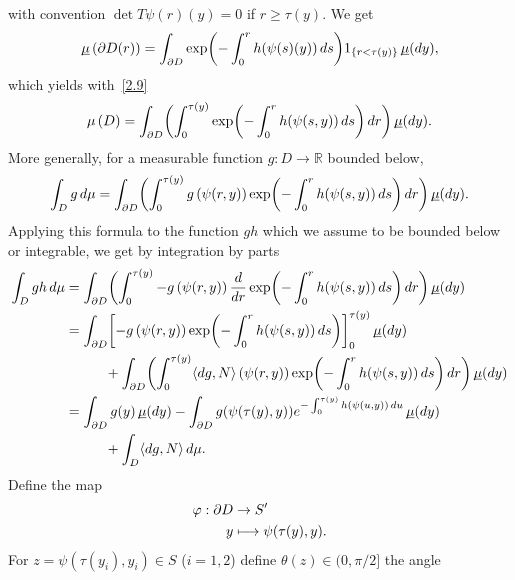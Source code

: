 \documentclass[JEP,XML,SOM,Unicode,NoFloatCountersInSection,published]{cedram}
\newcommand\mto{\mathchoice{\longmapsto}{\mapsto}{\mapsto}{\mapsto}}
\theoremstyle{plain}
\theoremstyle{definition}
\newcommand{\RR}{{\mathbb R}}
\newcommand{\usm}{{\underline{\smash{\mu}}}}
\let\f\frac
\begin{document}
with convention $\det T\psi(r)(y)=0$ if $r\ge \tau(y)$. We get
\begin{equation}
\usm\left(\partial D(r)\right)=\int_{\partial D}\exp\biggl(-\int_0^rh(\psi(s)(y))\,ds \biggr)1_{\{r<\tau(y)\}}\,\usm(dy),
\end{equation}
which yields with~\eqref{2.9}
\begin{equation}
\mu\left(D\right)=\int_{\partial D}\biggl(\int_0^{\tau(y)}\exp\biggl(-\int_0^rh(\psi(s,y))\,ds \biggr)\, dr\biggr)\,\usm(dy).
\end{equation}
More generally, for a measurable function $g: D\to \RR$ bounded below,\vspace*{-3pt}
\begin{equation}
\int_Dg\,d\mu=\int_{\partial D}\biggl(\int_0^{\tau(y)}g\left(\psi(r,y)\right)\exp\biggl(-\int_0^rh(\psi(s,y))\,ds \biggr)\, dr\biggr)\,\usm(dy).
\end{equation}
Applying this formula to the function $gh$ which we assume to be bounded below or integrable, we get by integration by parts\vspace*{-3pt}
\begin{align*}
\int_Dgh\,d\mu&=\int_{\partial D}\biggl(\int_0^{\tau(y)}-g\left(\psi(r,y)\right)\f{d}{dr}\exp\biggl(-\int_0^rh(\psi(s,y))\,ds \biggr)\, dr\biggr)\,\usm(dy)\\
&=\int_{\partial D}\biggl[-g\left(\psi(r,y)\right)\exp\biggl(-\int_0^rh(\psi(s,y))\,ds\biggr)\biggr]_0^{\tau(y)}\,\usm(dy)\\
&\hspace*{1cm}+\int_{\partial D}\biggl(\int_0^{\tau(y)}\langle dg,N\rangle\left(\psi(r,y)\right)\exp\biggl(-\int_0^rh(\psi(s,y))\,ds \biggr)\, dr\biggr)\,\usm(dy)\\
&=\int_{\partial D}g(y)\,\usm(dy)-\int_{\partial D}g(\psi(\tau(y),y))e^{-\int_0^{\tau(y)}h(\psi(u,y))\,du}\,\usm(dy)\\
&\hspace*{1cm}+\int_D\langle dg,N\rangle \, d\mu.
\end{align*}
Define the map\vspace*{-5pt}
\begin{equation}
\begin{split}
\varphi: \partial D &\to S'\\
y&\mto \psi(\tau(y),y).
\end{split}
\end{equation}
For $z=\psi(\tau(y_i),y_i)\in S$ ($i=1,2$) define $\theta(z){\in(0,\pi/2]}$ the angle
\end{document}
